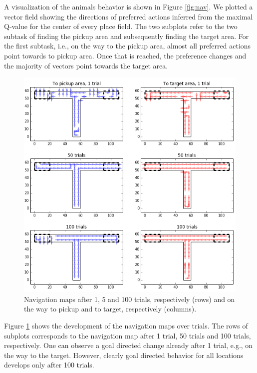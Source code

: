 A visualization of the animals behavior is shown in Figure \ref{fig:nav}. We plotted a vector field showing the directions of preferred actions inferred from the maximal Q-value for the center of every place field. The two subplots refer to the two subtask of finding the pickup area and subsequently finding the target area. For the first subtask, i.e., on the way to the pickup area, almost all preferred actions point towards to pickup area. Once that is reached, the preference changes and the majority of vectors point towards the target area. 

\begin{figure}[h]
\centering
\includegraphics[width=1\textwidth]{figures/navigation_map_trials.png}
\caption{\label{fig:nav_trials}Navigation maps after 1, 5 and 100 trials, respectively (rows) and on the way to pickup and to target, respectively (columns).}
\end{figure}

Figure \ref{fig:nav_trials} shows the development of the navigation maps over trials. The rows of subplots corresponds to the navigation map after 1 trial, 50 trials and 100 trials, respectively. One can observe a goal directed change already after 1 trial, e.g., on the way to the target. However, clearly goal directed behavior for all locations develops only after 100 trials. 


